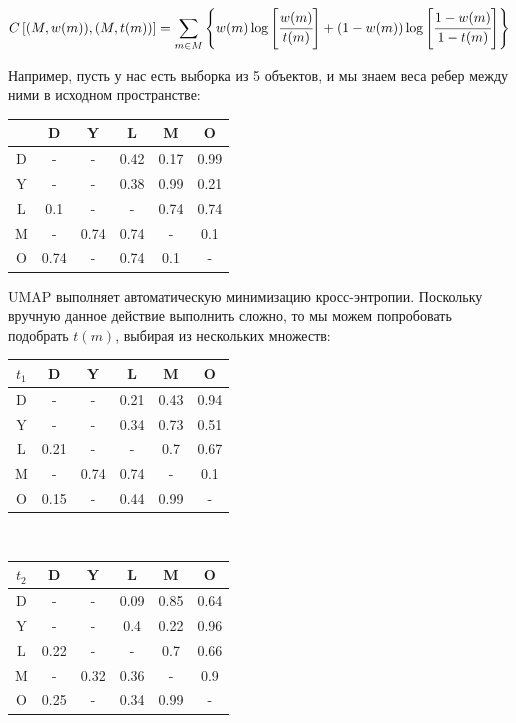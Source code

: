 \[C\left[(M, w(m)), (M, t(m))\right] = \sum_{m \in M} \left\{w(m) \log \left[\cfrac{w(m)}{t(m)}\right] + (1 - w(m)) \log \left[\cfrac{1 - w(m)}{1 - t(m)}\right]\right\}\]

Например, пусть у нас есть выборка из 5 объектов, и мы знаем веса ребер между ними в исходном пространстве:
\begin{center}
	\begin{tabular}{|c||c|c|c|c|c|}
		\hline
		& D & Y & L & M & O\\
		\hline
		\hline
		D & - & - & 0.42 & 0.17 & 0.99\\
		\hline
		Y & - & - & 0.38 & 0.99 & 0.21\\
		\hline
		L & 0.1 & - & - & 0.74 & 0.74 \\
		\hline
		M & - & 0.74 & 0.74 & - & 0.1 \\
		\hline 
		O & 0.74 & - & 0.74 & 0.1 & -\\
		\hline 
	\end{tabular}
\end{center}

UMAP выполняет автоматическую минимизацию кросс-энтропии. Поскольку вручную данное действие выполнить сложно, то мы можем попробовать подобрать $t(m)$, выбирая из нескольких множеств:

\begin{center}
	\begin{multicols}{2}
		\begin{tabular}{|c||c|c|c|c|c|}
			\hline
			$t_1$ & D & Y & L & M & O \\
			\hline
			\hline
			D & - & - & 0.21 & 0.43 & 0.94 \\
			\hline
			Y & - & - & 0.34 & 0.73 & 0.51 \\
			\hline
			L & 0.21 & - & - & 0.7 & 0.67 \\
			\hline
			M & - & 0.74 & 0.74 & - & 0.1 \\
			\hline 
			O & 0.15 & - & 0.44 & 0.99 & - \\
			\hline 
		\end{tabular}\\
		\begin{tabular}{|c||c|c|c|c|c|}
			\hline
			$t_2$ & D & Y & L & M & O\\
			\hline
			\hline
			D & - & - & 0.09 & 0.85 & 0.64\\
			\hline
			Y & - & - & 0.4 & 0.22 & 0.96\\
			\hline
			L & 0.22 & - & - & 0.7 & 0.66\\
			\hline
			M & - & 0.32 & 0.36 & - & 0.9 \\
			\hline 
			O & 0.25 & - & 0.34 & 0.99 & -\\
			\hline 
		\end{tabular}
	\end{multicols}
\end{center}

